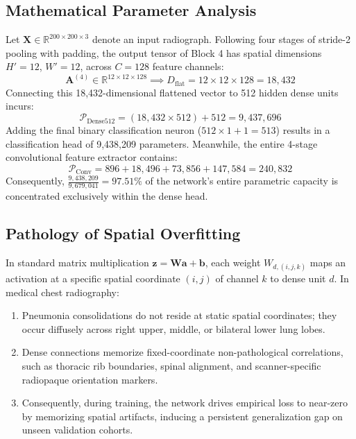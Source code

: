 \documentclass[conference]{IEEEtran}
\begin{document}
\subsection{Mathematical Parameter Analysis}
Let $\mathbf{X} \in \mathbb{R}^{200 \times 200 \times 3}$ denote an input radiograph. Following four stages of stride-2 pooling with padding, the output tensor of Block 4 has spatial dimensions $H' = 12$, $W' = 12$, across $C = 128$ feature channels:
\begin{equation}
\mathbf{A}^{(4)} \in \mathbb{R}^{12 \times 12 \times 128} \implies D_{\text{flat}} = 12 \times 12 \times 128 = 18,432
\label{eq_flat}
\end{equation}
Connecting this 18,432-dimensional flattened vector to 512 hidden dense units incurs:
\begin{equation}
\mathcal{P}_{\text{Dense512}} = (18,432 \times 512) + 512 = 9,437,696
\label{eq_dense}
\end{equation}
Adding the final binary classification neuron ($512 \times 1 + 1 = 513$) results in a classification head of 9,438,209 parameters. Meanwhile, the entire 4-stage convolutional feature extractor contains:
\begin{equation}
\mathcal{P}_{\text{Conv}} = 896 + 18,496 + 73,856 + 147,584 = 240,832
\label{eq_conv}
\end{equation}
Consequently, $\frac{9,438,209}{9,679,041} = \mathbf{97.51\%}$ of the network's entire parametric capacity is concentrated exclusively within the dense head.

\subsection{Pathology of Spatial Overfitting}
In standard matrix multiplication $\mathbf{z} = \mathbf{W}\mathbf{a} + \mathbf{b}$, each weight $W_{d, (i, j, k)}$ maps an activation at a specific spatial coordinate $(i, j)$ of channel $k$ to dense unit $d$. In medical chest radiography:
\begin{enumerate}
    \item Pneumonia consolidations do not reside at static spatial coordinates; they occur diffusely across right upper, middle, or bilateral lower lung lobes.
    \item Dense connections memorize fixed-coordinate non-pathological correlations, such as thoracic rib boundaries, spinal alignment, and scanner-specific radiopaque orientation markers.
    \item Consequently, during training, the network drives empirical loss to near-zero by memorizing spatial artifacts, inducing a persistent generalization gap on unseen validation cohorts.
\end{enumerate}
\end{document}
